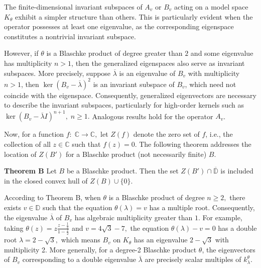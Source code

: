 \documentclass[12pt,reqno]{amsart}
\theoremstyle{definition}
\theoremstyle{remark}
\numberwithin{equation}{section}
\newcommand{\ol}{\overline}
\begin{document}
 The finite-dimensional invariant subspaces of $A_v$ or $B_v$ acting on a model space $K_\theta$ exhibit a simpler structure than others. This is particularly evident when the operator  possesses at least one eigenvalue, as the corresponding eigenspace constitutes a nontrivial invariant subspace.

 However, if $\theta$ is a Blaschke product of degree greater than $ 2$ and some eigenvalue has multiplicity $n> 1$, then the generalized eigenspaces also serve as invariant subspaces. More precisely, suppose $\ol{\lambda}$ is an eigenvalue of $B_v$ with multiplicity $n> 1$, then $\ker(B_v-\ol{\lambda})^2$ is  an invariant subspace of $B_v$, which need not coincide with the eigenspace. Consequently,  generalized eigenvectors are necessary to  describe the invariant subspaces, particularly for high-order kernels such as $\ker (B_v-\ol{\lambda}I)^{n+1},\;n\geq 1.$  Analogous results hold for the operator $A_v$.

Now, for a function $ f:\;\mathbb{C}\rightarrow \mathbb{C},$  let $Z(f)$ denote the zero set of $f$, i.e., the collection of all $z\in \mathbb{C}$ such that $f(z)=0$. The following theorem addresses   the location of   $Z(B')$ for a Blaschke product (not necessarily finite) $B$.\vspace{1mm}


\textbf{Theorem B}  \cite[Theorem 2.1]{CC} Let $B$ be a Blaschke product. Then the set $Z(B')\cap \ol{\mathbb{D}}$ is included in the closed convex hull of $Z(B)\cup\{0\}.$\vspace{1mm}

According to Theorem B, when $\theta$ is a Blaschke product of degree $n\geq 2,$ there exists  $v\in \mathbb{D}$   such that the equation $\theta(\lambda)=v$ has a multiple root. Consequently, the eigenvalue $\ol{\lambda}$ of   $B_v$ has algebraic multiplicity greater than $1$. For example, taking $\theta(z)=z\frac{z-\frac{1}{2}}{1-\frac{z}{2}}$ and $v=4\sqrt{3}-7,$ the equation $\theta(\lambda)-v=0$ has a double root $\lambda=2-\sqrt{3},$ which means $B_v$ on $K_\theta$ has an eigenvalue  $2-\sqrt{3}$ with  multiplicity 2.  More generally, for a degree-2 Blaschke product $\theta$,  the eigenvectors of $B_v$ corresponding to a double eigenvalue $\ol{\lambda}$ are precisely scalar multiples of $k_\lambda^\theta.$
\end{document}
